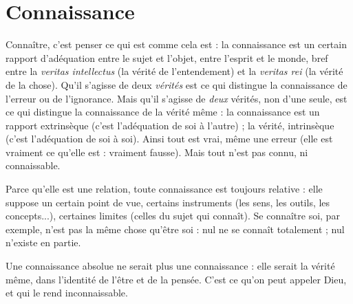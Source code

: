 \section{Connaissance}
Connaître, c’est penser ce qui est comme cela est : la
connaissance est un certain rapport d’adéquation entre
le sujet et l’objet, entre l'esprit et le monde, bref entre la {\it veritas intellectus} (la
vérité de l’entendement) et la {\it veritas rei} (la vérité de la chose). Qu'il s'agisse de
deux {\it vérités} est ce qui distingue la connaissance de l’erreur ou de l'ignorance.
Mais qu'il s'agisse de {\it deux} vérités, non d’une seule, est ce qui distingue la
connaissance de la vérité même : la connaissance est un rapport extrinsèque
(c’est l’adéquation de soi à l’autre) ; la vérité, intrinsèque (c’est l’adéquation de
soi à soi). Ainsi tout est vrai, même une erreur (elle est vraiment ce qu’elle est :
vraiment fausse). Mais tout n’est pas connu, ni connaissable.

Parce qu’elle est une relation, toute connaissance est toujours relative : elle
suppose un certain point de vue, certains instruments (les sens, les outils, les
concepts...), certaines limites (celles du sujet qui connaît). Se connaître soi, par
exemple, n’est pas la même chose qu'être soi : nul ne se connaît totalement ;
nul n'existe en partie.

Une connaissance absolue ne serait plus une connaissance : elle serait la
vérité même, dans l'identité de l’être et de la pensée. C’est ce qu’on peut
appeler Dieu, et qui le rend inconnaissable.

